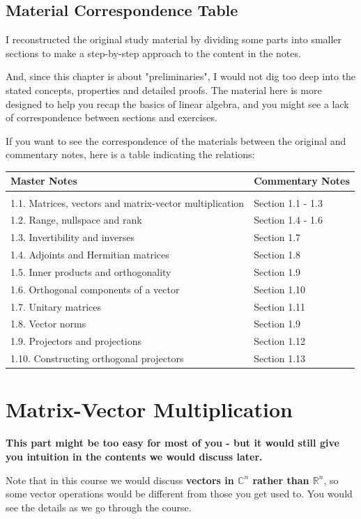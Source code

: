\subsection*{Material Correspondence Table}
I reconstructed the original study material by dividing some parts into smaller sections to make a step-by-step approach to the content in the notes. \smallskip

\noindent And, since this chapter is about "preliminaries", I would not dig too deep into the stated concepts, properties and detailed proofs. The material here is more designed to help you recap the basics of linear algebra, and you might see a lack of correspondence between sections and exercises.
\smallskip

\noindent If you want to see the correspondence of the materials between the original and commentary notes, here is a table indicating the relations: \bigskip

\noindent 
\begin{tabular}{ll}
  Master Notes & Commentary Notes \\
  \hline \\
  1.1. Matrices, vectors and matrix-vector multiplication & Section 1.1 - 1.3 \\
  1.2. Range, nullspace and rank & Section 1.4 - 1.6 \\
  1.3. Invertibility and inverses & Section 1.7  \\
  1.4. Adjoints and Hermitian matrices & Section 1.8 \\
  1.5. Inner products and orthogonality & Section 1.9 \\
  1.6. Orthogonal components of a vector & Section 1.10\\
  1.7. Unitary matrices & Section 1.11  \\
  1.8. Vector norms & Section 1.9\\
  1.9. Projectors and projections &  Section 1.12 \\
  1.10. Constructing orthogonal projectors  & Section 1.13
  \end{tabular}
\newpage
\section{Matrix-Vector Multiplication}%
\textbf{This part might be too easy for most of you - but it would still give you intuition in the contents we would discuss later.}\medskip

\noindent Note that in this course we would discuss \textbf{vectors in \(\mathbb{C}^{n}\) rather than \(\mathbb{R}^{n}\)}, so some vector operations would be different from those you get used to. You would see the details as we go through the course.
